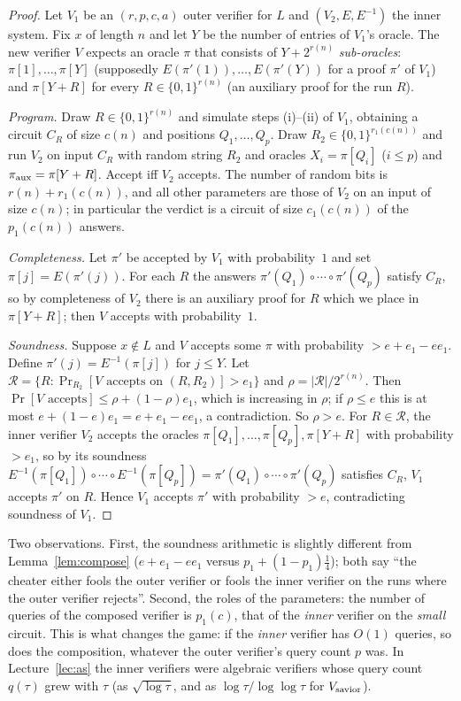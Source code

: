 \begin{proof}
Let $V_1$ be an $(r,p,c,a)$ outer verifier for $L$ and $(V_2,E,E^{-1})$ the inner system.  Fix $x$ of length $n$ and let $Y$ be the number of entries of $V_1$'s oracle.
The new verifier $V$ expects an oracle $\pi$ that consists of $Y+2^{r(n)}$ \emph{sub-oracles}: $\pi[1],\dots,\pi[Y]$ (supposedly $E(\pi'(1)),\dots,E(\pi'(Y))$ for a proof $\pi'$ of $V_1$) and $\pi[Y+R]$ for every $R\in\{0,1\}^{r(n)}$ (an auxiliary proof for the run $R$).

\emph{Program.}  Draw $R\in\{0,1\}^{r(n)}$ and simulate steps (i)--(ii) of $V_1$, obtaining a circuit $C_R$ of size $c(n)$ and positions $Q_1,\dots,Q_p$.  Draw $R_2\in\{0,1\}^{r_1(c(n))}$ and run $V_2$ on input $C_R$ with random string $R_2$ and oracles
$X_i=\pi[Q_i]$ ($i\le p$) and $\pi_{\rm aux}=\pi[Y+R]$.  Accept iff $V_2$ accepts.  The number of random bits is $r(n)+r_1(c(n))$, and all other parameters are those of $V_2$ on an input of size $c(n)$; in particular the verdict is a circuit of size $c_1(c(n))$ of the $p_1(c(n))$ answers.

\emph{Completeness.}  Let $\pi'$ be accepted by $V_1$ with probability~$1$ and set $\pi[j]=E(\pi'(j))$.  For each $R$ the answers $\pi'(Q_1)\circ\cdots\circ\pi'(Q_p)$ satisfy $C_R$, so by completeness of $V_2$ there is an auxiliary proof for $R$ which we place in $\pi[Y+R]$; then $V$ accepts with probability~$1$.

\emph{Soundness.}  Suppose $x\notin L$ and $V$ accepts some $\pi$ with probability $>e+e_1-ee_1$.  Define $\pi'(j)=E^{-1}(\pi[j])$ for $j\le Y$.  Let
$\mathcal R=\{R:\Pr_{R_2}[V\text{ accepts on }(R,R_2)]>e_1\}$ and $\rho=|\mathcal R|/2^{r(n)}$.  Then $\Pr[V\text{ accepts}]\le\rho+(1-\rho)e_1$, which is increasing in $\rho$; if $\rho\le e$ this is at most $e+(1-e)e_1=e+e_1-ee_1$, a contradiction.
So $\rho>e$.  For $R\in\mathcal R$, the inner verifier $V_2$ accepts the oracles $\pi[Q_1],\dots,\pi[Q_p],\pi[Y+R]$ with probability $>e_1$, so by its soundness
$E^{-1}(\pi[Q_1])\circ\cdots\circ E^{-1}(\pi[Q_p])=\pi'(Q_1)\circ\cdots\circ\pi'(Q_p)$ satisfies $C_R$, \ie $V_1$ accepts $\pi'$ on $R$.  Hence $V_1$ accepts $\pi'$ with probability $>e$, contradicting soundness of $V_1$.
\end{proof}

\noindent
Two observations.  First, the soundness arithmetic is slightly different from Lemma~\ref{lem:compose} ($e+e_1-ee_1$ versus $p_1+(1-p_1)\tfrac14$); both say ``the cheater either fools the outer verifier or fools the inner verifier on the runs where the outer verifier rejects''.  Second, the roles of the parameters:
the number of queries of the composed verifier is $p_1(c)$, that of the \emph{inner} verifier on the \emph{small} circuit.  This is what changes the game: if the \emph{inner} verifier has $O(1)$ queries,
so does the composition, whatever the outer verifier's query count $p$ was.  In Lecture~\ref{lec:as} the inner verifiers were algebraic verifiers whose query count $q(\tau)$ grew with $\tau$ (as $\sqrt{\log\tau}$, and as $\log\tau/\log\log\tau$ for $V_{\rm savior}$).


